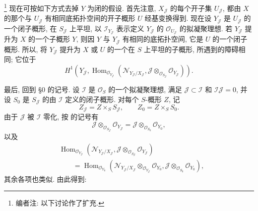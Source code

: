 \footnote{编者注: 以下讨论作了扩充.}
现在可按如下方式去掉 \(Y\) 为闭的假设.
首先注意, \(X_{\mathscr J}\) 的每个开子集 \(U_{\mathscr J}\),
都由 \(X\) 的那个与 \(U_{\mathscr J}\) 有相同底拓扑空间的开子概形
\(U\) 经基变换得到.
现在设 \(Y_{\mathscr J}\) 是 \(U_{\mathscr J}\) 的一个闭子概形,
在 \(S_{\mathscr J}\) 上平坦,
以 \(\mathscr I_{Y_{\mathscr J}}\) 表示定义 \(Y_{\mathscr J}\)
的 \(\mathscr O_{U_{\mathscr J}}\) 的拟凝聚理想.
若 \(Y_{\mathscr J}\) 提升为 \(X\) 的一个子概形 \(Y\),
则因 \(Y\) 与 \(Y_{\mathscr J}\) 有相同的底拓扑空间,
它是 \(U\) 的一个闭子概形.
所以, 将 \(Y_{\mathscr J}\) 提升为 \(X\) 或 \(U\)
的一个在 \(S\) 上平坦的子概形, 所遇到的障碍相同; 它位于
\[
 H^1\!\left(
  Y_{\mathscr J},
  \operatorname{Hom}_{\mathscr O_{Y_{\mathscr J}}}
  \left(
   \mathscr N_{Y_{\mathscr J}/X_{\mathscr J}},
   \mathscr J\otimes_{\mathscr O_{S_{\mathscr J}}}
    \mathscr O_{Y_{\mathscr J}}
  \right)
 \right).
\]

最后, 回到 \S0 的记号.
设 \(\mathscr I\) 是 \(\mathscr O_S\) 的一个拟凝聚理想,
满足 \(\mathscr J\subset\mathscr I\) 和 \(\mathscr I\mathscr J=0\),
并设 \(S_0\) 是 \(S_{\mathscr J}\) 的由 \(\mathscr I\) 定义的闭子概形.
对每个 \(S\)-概形 \(Z\), 记
\[
 Z_{\mathscr J}=Z\times_S S_{\mathscr J},
 \qquad Z_0=Z\times_S S_0.
\]
由于 \(\mathscr J\) 被 \(\mathscr I\) 零化,
按  的记号有
\[
 \mathscr J\otimes_{\mathscr O_{S_{\mathscr J}}}
  \mathscr O_{Y_{\mathscr J}}
 =\mathscr J\otimes_{\mathscr O_{S_0}}\mathscr O_{Y_0},
\]
以及
\[
 \begin{split}
 &\operatorname{Hom}_{\mathscr O_{Y_{\mathscr J}}}
 \left(
  \mathscr N_{Y_{\mathscr J}/X_{\mathscr J}},
  \mathscr J\otimes_{\mathscr O_{S_{\mathscr J}}}
   \mathscr O_{Y_{\mathscr J}}
 \right) \\
 &\qquad={}
 \operatorname{Hom}_{\mathscr O_{Y_0}}
 \left(
  \mathscr N_{Y_{\mathscr J}/X_{\mathscr J}}
   \otimes_{\mathscr O_{Y_{\mathscr J}}}\mathscr O_{Y_0},
  \mathscr J\otimes_{\mathscr O_{S_0}}\mathscr O_{Y_0}
 \right),
 \end{split}
\]
其余各项也类似. 由此得到:

